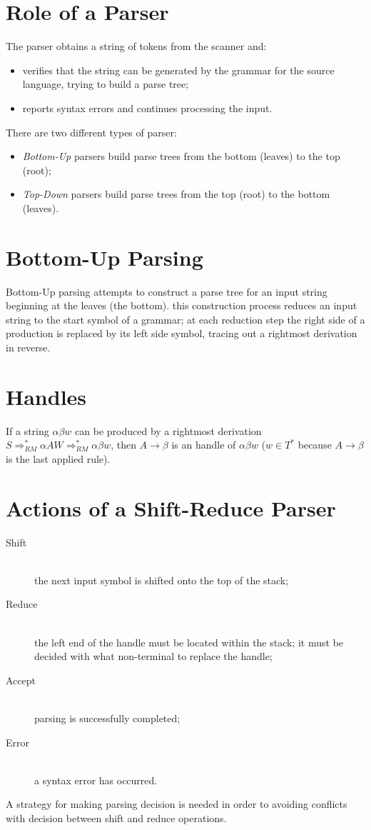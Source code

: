 \section{Role of a Parser}
The parser obtains a string of tokens from the scanner and:
\begin{itemize}
    \item verifies that the string can be generated by the grammar for the source language, trying to build a parse tree;
    \item reports syntax errors and continues processing the input.
\end{itemize}
There are two different types of parser:
\begin{itemize}
    \item \emph{Bottom-Up} parsers build parse trees from the bottom (leaves) to the top (root);
    \item \emph{Top-Down} parsers build parse trees from the top (root) to the bottom (leaves).
\end{itemize}

\section{Bottom-Up Parsing}
Bottom-Up parsing attempts to construct a parse tree for an input string beginning at the leaves (the bottom).
this construction process reduces an input string to the start symbol of a grammar; at each reduction step the right side of a production is replaced by its left side symbol, tracing out a rightmost derivation in reverse.

\section{Handles}
If a string $\alpha \beta w$ can be produced by a rightmost derivation $S \Rightarrow^\ast_{RM} \alpha AW \Rightarrow^\ast_{RM} \alpha \beta w$, then $A \to \beta$ is an handle of $\alpha \beta w$ ($w \in T^\ast$ because $A \to \beta$ is the last applied rule).

\section{Actions of a Shift-Reduce Parser}
\begin{description}
    \item[Shift]\mbox{}\\
    the next input symbol is shifted onto the top of the stack;
    \item[Reduce]\mbox{}\\
    the left end of the handle must be located within the stack; it must be decided with what non-terminal to replace the handle;
    \item[Accept]\mbox{}\\
    parsing is successfully completed;
    \item[Error]\mbox{}\\
    a syntax error has occurred.
\end{description}
A strategy for making parsing decision is needed in order to avoiding conflicts with decision between shift and reduce operations.

